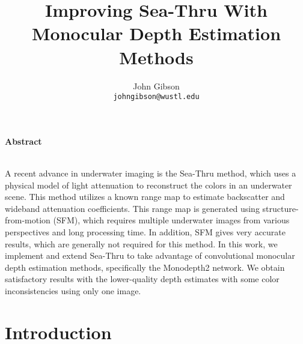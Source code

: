 \documentclass[10pt,twocolumn,letterpaper]{article}
\date{}
\title{Improving Sea-Thru With Monocular Depth Estimation Methods}
\author{%
John Gibson\\
{\tt johngibson@wustl.edu}
}
\begin{document}
\maketitle

\begin{center}\textbf{Abstract}\\~\\\parbox{0.475\textwidth}{\em

    A recent advance in underwater imaging is the Sea-Thru method,
    which uses a physical model of light attenuation to reconstruct
    the colors in an underwater scene. This method utilizes a known
    range map to estimate backscatter and wideband attenuation
    coefficients. This range map is generated using structure-from-motion (SFM),
    which requires multiple underwater images from various perspectives and
    long processing time. In addition, SFM gives very accurate results, which are
    generally not required for this method. In this work, we implement and
    extend Sea-Thru to take advantage of convolutional monocular depth
    estimation methods, specifically the Monodepth2 network. We obtain
    satisfactory results with the lower-quality depth estimates with
    some color inconsistencies using only one image.

}\end{center}

\section{Introduction}

%
\end{document}
